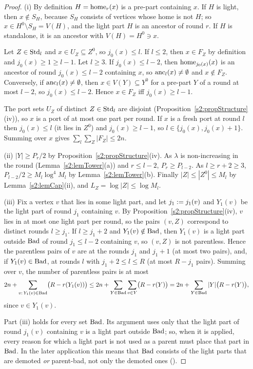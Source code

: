 \begin{proof}
(i) By definition $H=\mathrm{home}_r(x)$ is a pre-part containing $x$. If $H$ is light,
then $x\notin S_H$, because $S_H$ consists of vertices whose home is not $H$;
so $x\in H^0\setminus S_H=V(H)$, and the light part $H$ is an ancestor of round
$r$. If $H$ is standalone, it is an ancestor with $V(H)=H^0\ni x$.

Let $Z\in\mathrm{Std}_l$ and $x\in U_Z\subseteq Z^0$, so $j_0(x)\le l$. If $l\le2$,
then $x\in F_Z$ by definition and $j_0(x)\ge1\ge l-1$. Let $l\ge3$. If
$j_0(x)\le l-2$, then $\mathrm{home}_{j_0(x)}(x)$ is an ancestor of round $j_0(x)\le
l-2$ containing $x$, so $\mathrm{anc}_l(x)\ne\emptyset$ and $x\notin F_Z$. Conversely,
if $\mathrm{anc}_l(x)\ne\emptyset$, then $x\in V(Y)\subseteq Y^0$ for a pre-part $Y$ of
a round at most $l-2$, so $j_0(x)\le l-2$. Hence $x\in F_Z$ iff $j_0(x)\ge
l-1$.

The port sets $U_Z$ of distinct $Z\in\mathrm{Std}_l$ are disjoint
(Proposition~\ref{s2:propStructure}(iv)), so $x$ is a port of at most one part
per round. If $x$ is a fresh port at round $l$ then $j_0(x)\le l$ (it lies in
$Z^0$) and $j_0(x)\ge l-1$, so $l\in\{j_0(x),j_0(x)+1\}$. Summing over $x$
gives $\sum_l\sum_Z|F_Z|\le2n$.

(ii) $|Y|\ge P_r/2$ by Proposition~\ref{s2:propStructure}(iv). As $\lambda$ is
non-increasing in the round (Lemma~\ref{s2:lemTower}(a)) and $r\le l-2$,
$P_r\ge P_{l-2}$. As $l\ge r+2\ge3$, $P_{l-2}/2\ge M_l\log^4M_l$ by
Lemma~\ref{s2:lemTower}(b). Finally $|Z|\le|Z^0|\le M_l$ by
Lemma~\ref{s2:lemCap}(ii), and $L_Z=\log|Z|\le\log M_l$.

(iii) Fix a vertex $v$ that lies in some light part, and let $j_1\mathrel{:=}
j_1(v)$ and $Y_1(v)$ be the light part of round $j_1$ containing $v$. By
Proposition~\ref{s2:propStructure}(iv), $v$ lies in at most one light part per
round, so the pairs $(v,Z)$ correspond to distinct rounds $l\ge j_1$. If $l\ge
j_1+2$ and $Y_1(v)\notin\mathrm{Bad}$, then $Y_1(v)$ is a light part outside $\mathrm{Bad}$ of
round $j_1\le l-2$ containing $v$, so $(v,Z)$ is not parentless. Hence the
parentless pairs of $v$ are at the rounds $j_1$ and $j_1+1$ (at most two
pairs), and, if $Y_1(v)\in\mathrm{Bad}$, at rounds $l$ with $j_1+2\le l\le R$ (at most
$R-j_1$ pairs). Summing over $v$, the number of parentless pairs is at most
\[
2n+\sum_{v:\,Y_1(v)\in\mathrm{Bad}}\bigl(R-r(Y_1(v))\bigr)\le2n+\sum_{Y\in\mathrm{Bad}}
\sum_{v\in Y}\bigl(R-r(Y)\bigr)=2n+\sum_{Y\in\mathrm{Bad}}|Y|\bigl(R-r(Y)\bigr),
\]
since $v\in Y_1(v)$.

Part (iii) holds for every set $\mathrm{Bad}$. Its argument uses only that the light
part of round $j_1(v)$ containing $v$ is a light part outside $\mathrm{Bad}$; so, when
it is applied, every reason for which a light part is not used as a parent must
place that part in $\mathrm{Bad}$. In the later application this means that $\mathrm{Bad}$
consists of the light parts that are demoted \emph{or} parent-bad, not only the
demoted ones ().
\end{proof}

